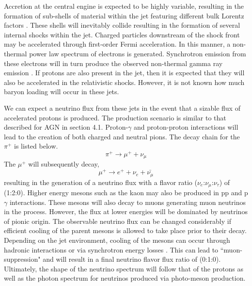 \documentclass{gatech-thesis}
\begin{document}
Accretion at the central engine is expected to be highly variable, resulting in the formation of sub-shells of material within the jet featuring different bulk Lorentz factors \cite{2014arXiv1410.0679K}. These shells will inevitably collide resulting in the formation of several internal shocks within the jet. Charged particles downstream of the shock front may be accelerated through first-order Fermi acceleration. In this manner, a non-thermal power law spectrum of electrons is generated. Synchrotron emission from these electrons will in turn produce the observed non-thermal gamma ray emission \cite{1996ApJ...461L..37B}. If protons are also present in the jet, then it is expected that they will also be accelerated in the relativistic shocks. However, it is not known how much baryon loading will occur in these jets.

We can expect a neutrino flux from these jets in the event that a sizable flux of accelerated protons is produced. The production scenario is similar to that described for AGN in section 4.1. Proton-$\gamma$ and proton-proton interactions will lead to the creation of both charged and neutral pions. The decay chain for the $\pi^+$ is listed below.
\begin{equation}\label{eq:pidecay}
\pi^{+} \rightarrow \mu^{+} + \nu_{\mu}
\end{equation}
The $\mu^+$ will subsequently decay,
\begin{equation}
\mu^+ \rightarrow e^+ + \nu_e + \bar{\nu_{\mu}}
\end{equation}
resulting in the generation of a neutrino flux with a flavor ratio ($\nu_e$:$\nu_{\mu}$:$\nu_{\tau}$) of (1:2:0). Higher energy mesons such as the kaon may also be produced in pp and p$\gamma$ interactions. These mesons will also decay to muons generating muon neutrinos in the process. However, the flux at lower energies will be dominated by neutrinos of pionic origin. The observable neutrino flux can be changed considerably if efficient cooling of the parent mesons is allowed to take place prior to their decay. Depending on the jet environment, cooling of the mesons can occur through hadronic interactions or via synchrotron energy losses \cite{2005PhRvL..95f1103A}. This can lead to ``muon-suppression" and will result in a final neutrino flavor flux ratio of (0:1:0). Ultimately, the shape of the neutrino spectrum will follow that of the protons as well as the photon spectrum for neutrinos produced via photo-meson production.
\end{document}
